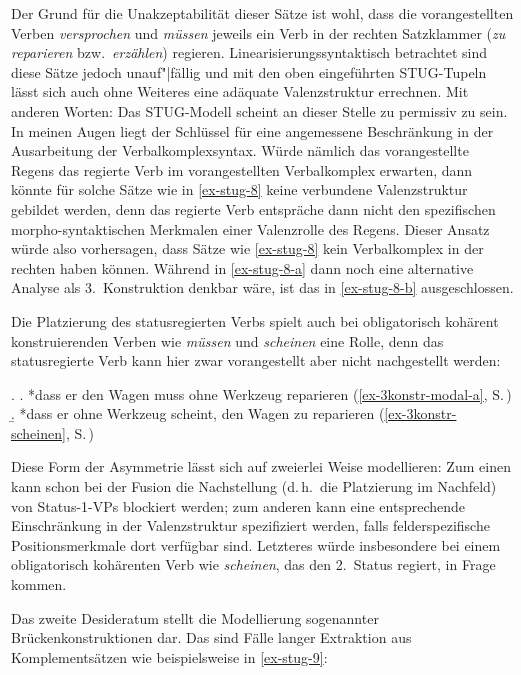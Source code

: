 Der Grund für die Unakzeptabilität dieser Sätze ist wohl, dass die vorangestellten Verben {\it versprochen} und {\it müssen} jeweils ein Verb in der rechten Satzklammer ({\it zu reparieren} bzw.\ {\it erzählen}) regieren. Linearisierungssyntaktisch betrachtet sind diese Sätze jedoch unauf"|fällig und mit den oben eingeführten STUG-Tupeln lässt sich auch ohne Weiteres eine adäquate Valenzstruktur errechnen. Mit anderen Worten: Das STUG-Modell scheint an dieser Stelle zu permissiv zu sein. In meinen Augen liegt der Schlüssel für eine angemessene Beschränkung in der Ausarbeitung der Verbalkomplexsyntax. Würde nämlich das vorangestellte Regens das regierte Verb im vorangestellten Verbalkomplex erwarten, dann könnte für solche Sätze wie in \ref{ex-stug-8} keine verbundene Valenzstruktur gebildet werden, denn das regierte Verb entspräche dann nicht den spezifischen morpho-syntaktischen Merkmalen einer Valenzrolle des Regens. Dieser Ansatz würde also vorhersagen, dass Sätze wie \ref{ex-stug-8} kein Verbalkomplex in der rechten  haben können. Während in \ref{ex-stug-8-a} dann noch eine alternative Analyse als 3.~Konstruktion denkbar wäre, ist das in \ref{ex-stug-8-b} ausgeschlossen. 

Die Platzierung des statusregierten Verbs spielt auch bei obligatorisch kohärent konstruierenden Verben wie {\it müssen} und {\it scheinen} eine Rolle, denn das statusregierte Verb kann hier zwar vorangestellt aber nicht nachgestellt werden:

\ex.
\a. *dass er den Wagen muss ohne Werkzeug reparieren \hfill (\ref{ex-3konstr-modal-a}, S.\,\pageref{ex-3konstr-modal-a})
\b. *dass er ohne Werkzeug scheint, den Wagen zu reparieren \hfill (\ref{ex-3konstr-scheinen}, S.\,\pageref{ex-3konstr-scheinen})

Diese Form der Asymmetrie lässt sich auf zweierlei Weise modellieren: Zum einen kann schon bei der Fusion die Nachstellung (d.\,h.\ die Platzierung im Nachfeld) von Status-1-VPs blockiert werden; zum anderen kann eine entsprechende Einschränkung in der Valenzstruktur spezifiziert werden, falls felderspezifische \clearpage Positionsmerkmale dort verfügbar sind. Letzteres würde insbesondere bei einem obligatorisch kohärenten Verb wie {\it scheinen}, das den 2.~Status regiert, in Frage kommen.


Das zweite Desideratum stellt die Modellierung sogenannter Brückenkonstruktionen dar. Das sind  Fälle langer Extraktion aus Komplementsätzen wie beispielsweise in \ref{ex-stug-9}: 

